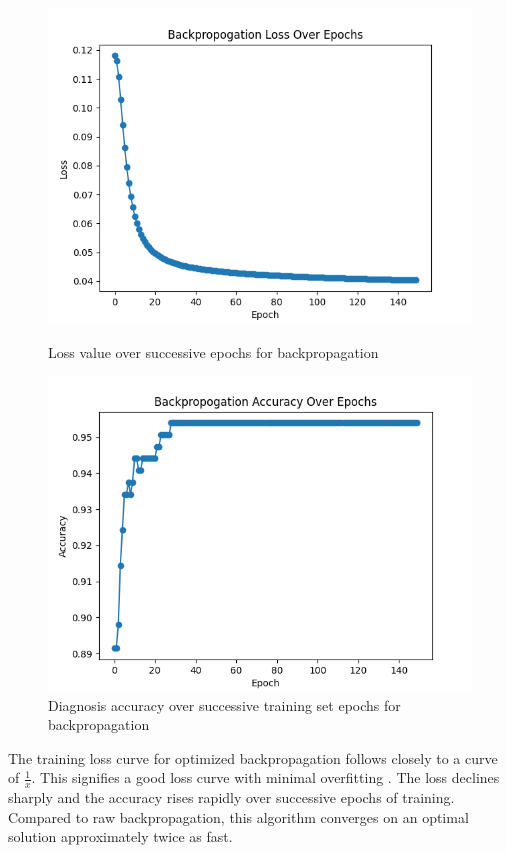 \documentclass[12pt]{article}
\begin{document}
        \begin{figure}[h]
            \begin{minipage}{0.48\textwidth}
                \centering
                \includegraphics[width=.9\linewidth]{decisionlosses.png}
                \caption{Loss value over successive epochs for backpropagation}
            \end{minipage}\hfill
            \begin{minipage}{0.48\textwidth}
                \centering
                \includegraphics[width=.9\linewidth]{decisionaccuracy.png}
                \caption{Diagnosis accuracy over successive training set epochs for backpropagation}
            \end{minipage}
        \end{figure}

        The training loss curve for optimized backpropagation follows closely to a curve of \(\frac{1}{x}\).  This signifies a good loss curve with minimal
        overfitting \cite{goodLoss}.  The loss declines sharply and the accuracy rises rapidly over successive epochs of training.
        Compared to raw backpropagation, this algorithm converges on an optimal solution approximately twice as fast.
\end{document}
